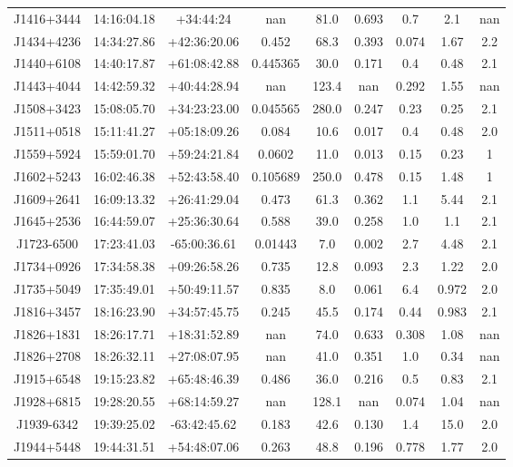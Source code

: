 \begin{table}
\begin{tabular}{@{}ccccccccc@{}}
        J1416+3444 & 14:16:04.18 & +34:44:24 & nan & 81.0 & 0.693 & 0.7 & 2.1 & nan \\
        J1434+4236 & 14:34:27.86 & +42:36:20.06 & 0.452 & 68.3 & 0.393 & 0.074 & 1.67 & 2.2 \\
        J1440+6108 & 14:40:17.87 & +61:08:42.88 & 0.445365 & 30.0 & 0.171 & 0.4 & 0.48 & 2.1 \\
        J1443+4044 & 14:42:59.32 & +40:44:28.94 & nan & 123.4 & nan & 0.292 & 1.55 & nan \\
        J1508+3423 & 15:08:05.70 & +34:23:23.00 & 0.045565 & 280.0 & 0.247 & 0.23 & 0.25 & 2.1 \\
        J1511+0518 & 15:11:41.27 & +05:18:09.26 & 0.084 & 10.6 & 0.017 & 0.4 & 0.48 & 2.0 \\
        J1559+5924 & 15:59:01.70 & +59:24:21.84 & 0.0602 & 11.0 & 0.013 & 0.15 & 0.23 & 1 \\
        J1602+5243 & 16:02:46.38 & +52:43:58.40 & 0.105689 & 250.0 & 0.478 & 0.15 & 1.48 & 1 \\
        J1609+2641 & 16:09:13.32 & +26:41:29.04 & 0.473 & 61.3 & 0.362 & 1.1 & 5.44 & 2.1 \\
        J1645+2536 & 16:44:59.07 & +25:36:30.64 & 0.588 & 39.0 & 0.258 & 1.0 & 1.1 & 2.1 \\
        J1723-6500 & 17:23:41.03 & -65:00:36.61 & 0.01443 & 7.0 & 0.002 & 2.7 & 4.48 & 2.1 \\
        J1734+0926 & 17:34:58.38 & +09:26:58.26 & 0.735 & 12.8 & 0.093 & 2.3 & 1.22 & 2.0 \\
        J1735+5049 & 17:35:49.01 & +50:49:11.57 & 0.835 & 8.0 & 0.061 & 6.4 & 0.972 & 2.0 \\
        J1816+3457 & 18:16:23.90 & +34:57:45.75 & 0.245 & 45.5 & 0.174 & 0.44 & 0.983 & 2.1 \\
        J1826+1831 & 18:26:17.71 & +18:31:52.89 & nan & 74.0 & 0.633 & 0.308 & 1.08 & nan \\
        J1826+2708 & 18:26:32.11 & +27:08:07.95 & nan & 41.0 & 0.351 & 1.0 & 0.34 & nan \\
        J1915+6548 & 19:15:23.82 & +65:48:46.39 & 0.486 & 36.0 & 0.216 & 0.5 & 0.83 & 2.1 \\
        J1928+6815 & 19:28:20.55 & +68:14:59.27 & nan & 128.1 & nan & 0.074 & 1.04 & nan \\
        J1939-6342 & 19:39:25.02 & -63:42:45.62 & 0.183 & 42.6 & 0.130 & 1.4 & 15.0 & 2.0 \\
        J1944+5448 & 19:44:31.51 & +54:48:07.06 & 0.263 & 48.8 & 0.196 & 0.778 & 1.77 & 2.0 \\

\end{tabular}
\end{table}
